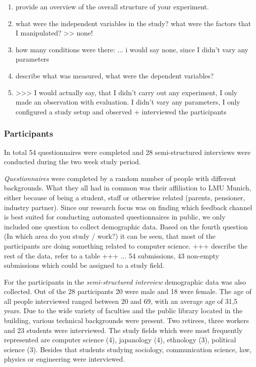 		\begin{enumerate}
		\item provide an overview of the overall structure of your experiment. 
		\item what were the independent variables in the study? what were the factors that I manipulated? >> none! 
		\item how many conditions were there: ... i would say none, since I didn't vary any parameters
		\item describe what was measured, what were the dependent variables?
		\item >>> I would actually say, that I didn't carry out any experiment, I only made an observation with evaluation. I didn't vary any parameters, I only configured a study setup and observed + interviewed the participants
		\end{enumerate}




	\subsubsection{Participants}

		In total 54 questionnaires were completed and 28 semi-structured interviews were conducted during the two week study period.

		\textit{Questionnaires} were completed by a random number of people with different backgrounds. What they all had in common was their affiliation to LMU Munich, either because of being a student, staff or otherwise related (parents, pensioner, industry partner). Since our research focus was on finding which feedback channel is best suited for conducting automated questionnaires in public, we only included one question to collect demographic data. Based on the fourth question (In which area do you study / work?) it can be seen, that most of the participants are doing something related to computer science.
			+++ describe the rest of the data, refer to a table +++
		 ... 
			54 submissions, 43 non-empty submissions which could be assigned to a study field.

		For the participants in the \textit{semi-structured interview} demographic data was also collected. Out of the 28 participants
		20 were male and 18 were female. The age of all people interviewed ranged between 20 and 69, with an average age of 31,5 years.
		Due to the wide variety of faculties and the public library located in the building, various technical backgrounds were present. Two retirees, three workers and 23 students were interviewed. The study fields which were most frequently represented are computer science (4), japanology (4), ethnology (3), political science (3). Besides that students studying sociology, communication science, law, physics or engineering were interviewed.


